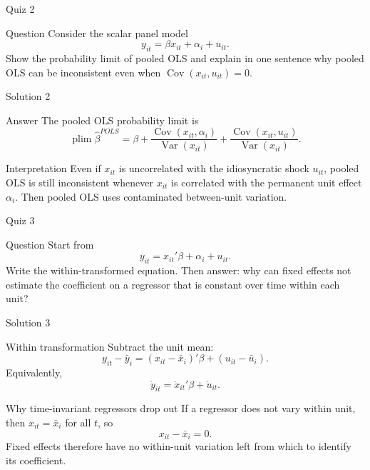 \documentclass[10pt]{beamer}
\DeclareMathOperator{\Cov}{Cov}
\DeclareMathOperator{\Var}{Var}
\newcommand{\plim}{\operatorname*{plim}}
\begin{document}
\begin{frame}{Quiz 2}
\small
\begin{block}{Question}
Consider the scalar panel model
\[
y_{it} = \beta x_{it} + \alpha_i + u_{it}.
\]
Show the probability limit of pooled OLS and explain in one sentence why pooled OLS can be inconsistent even when $\Cov(x_{it},u_{it})=0$.
\end{block}
\end{frame}

\begin{frame}{Solution 2}
\small
\begin{exampleblock}{Answer}
The pooled OLS probability limit is
\[
\plim \hat{\beta}^{POLS}
=
\beta
+ \frac{\Cov(x_{it},\alpha_i)}{\Var(x_{it})}
+ \frac{\Cov(x_{it},u_{it})}{\Var(x_{it})}.
\]
\end{exampleblock}

\begin{block}{Interpretation}
Even if $x_{it}$ is uncorrelated with the idiosyncratic shock $u_{it}$, pooled OLS is still inconsistent whenever $x_{it}$ is correlated with the permanent unit effect $\alpha_i$. Then pooled OLS uses contaminated between-unit variation.
\end{block}
\end{frame}

\begin{frame}{Quiz 3}
\small
\begin{block}{Question}
Start from
\[
y_{it}=x_{it}'\beta+\alpha_i+u_{it}.
\]
Write the within-transformed equation. Then answer: why can fixed effects not estimate the coefficient on a regressor that is constant over time within each unit?
\end{block}
\end{frame}

\begin{frame}{Solution 3}
\small
\begin{exampleblock}{Within transformation}
Subtract the unit mean:
\[
y_{it}-\bar y_i = (x_{it}-\bar x_i)'\beta + (u_{it}-\bar u_i).
\]
Equivalently,
\[
\ddot y_{it}=\ddot x_{it}'\beta+\ddot u_{it}.
\]
\end{exampleblock}

\begin{block}{Why time-invariant regressors drop out}
If a regressor does not vary within unit, then $x_{it}=\bar x_i$ for all $t$, so
\[
x_{it}-\bar x_i=0.
\]
Fixed effects therefore have no within-unit variation left from which to identify its coefficient.
\end{block}
\end{frame}
\end{document}
